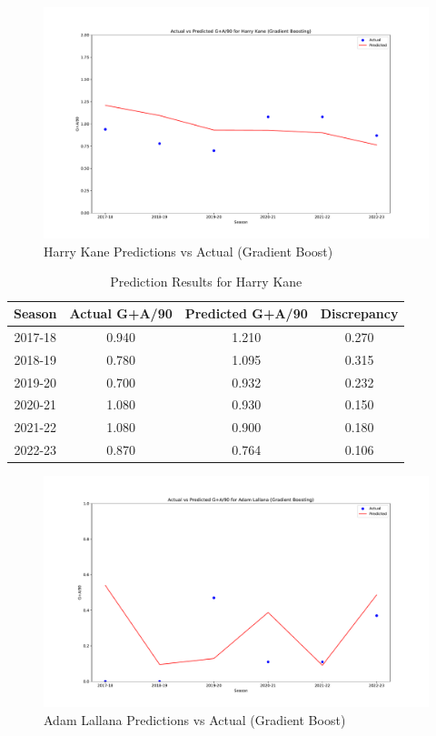 \documentclass[12pt]{article}
\begin{document}

\begin{figure}[H]
  \centering
  \includegraphics[width=1\textwidth]{GradBoost_Kane.pdf}
  \caption{Harry Kane Predictions vs Actual (Gradient Boost)}
  \label{fig:Kane_graph}
  \end{figure}


  \begin{table}[H]
    \centering
    \begin{tabular}{|c|c|c|c|}
    \hline
    \textbf{Season} & \textbf{Actual G+A/90} & \textbf{Predicted G+A/90} & \textbf{Discrepancy} \\
    \hline
    2017-18 & 0.940 & 1.210 & 0.270 \\
    2018-19 & 0.780 & 1.095 & 0.315 \\
    2019-20 & 0.700 & 0.932 & 0.232 \\
    2020-21 & 1.080 & 0.930 & 0.150 \\
    2021-22 & 1.080 & 0.900 & 0.180 \\
    2022-23 & 0.870 & 0.764 & 0.106 \\
    \hline
    \end{tabular}
    \caption{Prediction Results for Harry Kane}
    \label{tab:kane_prediction_results}
  \end{table}
  

\begin{figure}[H]
  \centering
  \includegraphics[width=1\textwidth]{GradBoost_Lallana.pdf}
  \caption{Adam Lallana Predictions vs Actual (Gradient Boost)}
  \label{fig:Lallana_graph}
  \end{figure}
\end{document}
